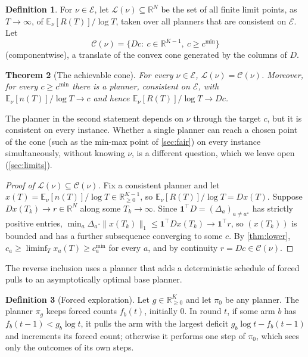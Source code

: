 \documentclass[11pt,a4paper]{article}
\theoremstyle{plain}
\newtheorem{theorem}{Theorem}
\theoremstyle{definition}
\newtheorem{definition}[theorem]{Definition}
\theoremstyle{remark}
\newcommand{\E}{\mathbb{E}}
\newcommand{\R}{\mathbb{R}}
\newcommand{\cmin}{c^{\min}}
\newcommand{\astar}{a^\star}
\newcommand{\Env}{\mathcal{E}}
\begin{document}
\begin{definition}
For $\nu\in\Env$, let $\mathcal L(\nu)\subseteq\R^N$ be the set of all finite limit points, as $T\to\infty$, of $\E_\nu[R(T)]/\log T$, taken over all planners that are consistent on $\Env$. Let
\[
  \mathcal C(\nu)=\{Dc:\ c\in\R^{K-1},\ c\ge\cmin\}
\]
(componentwise), a translate of the convex cone generated by the columns of $D$.
\end{definition}

\begin{theorem}[The achievable cone]\label{thm:cone}
For every $\nu\in\Env$, $\mathcal L(\nu)=\mathcal C(\nu)$. Moreover, for every $c\ge\cmin$ there is a planner, consistent on $\Env$, with $\E_\nu[n(T)]/\log T\to c$ and hence $\E_\nu[R(T)]/\log T\to Dc$.
\end{theorem}

The planner in the second statement depends on $\nu$ through the target $c$, but it is consistent on every instance. Whether a single planner can reach a chosen point of the cone (such as the min-max point of \cref{sec:fair}) on every instance simultaneously, without knowing $\nu$, is a different question, which we leave open (\cref{sec:limits}).

\begin{proof}[Proof of $\mathcal L(\nu)\subseteq\mathcal C(\nu)$]
Fix a consistent planner and let $x(T)=\E_\nu[n(T)]/\log T\in\R^{K-1}_{\ge0}$, so $\E_\nu[R(T)]/\log T=Dx(T)$. Suppose $Dx(T_k)\to r\in\R^N$ along some $T_k\to\infty$. Since $\mathbf 1^\top D=(\Delta_a)_{a\neq\astar}$ has strictly positive entries, $\min_a\Delta_a\cdot\|x(T_k)\|_1\le\mathbf 1^\top Dx(T_k)\to\mathbf 1^\top r$, so $(x(T_k))$ is bounded and has a further subsequence converging to some $c$. By \cref{thm:lower}, $c_a\ge\liminf_Tx_a(T)\ge\cmin_a$ for every $a$, and by continuity $r=Dc\in\mathcal C(\nu)$.
\end{proof}

The reverse inclusion uses a planner that adds a deterministic schedule of forced pulls to an asymptotically optimal base planner.

\begin{definition}[Forced exploration]\label{def:forced}
Let $g\in\R^K_{\ge0}$ and let $\pi_0$ be any planner. The planner $\pi_g$ keeps forced counts $f_b(t)$, initially $0$. In round $t$, if some arm $b$ has $f_b(t-1)<g_b\log t$, it pulls the arm with the largest deficit $g_b\log t-f_b(t-1)$ and increments its forced count; otherwise it performs one step of $\pi_0$, which sees only the outcomes of its own steps.
\end{definition}
\end{document}
